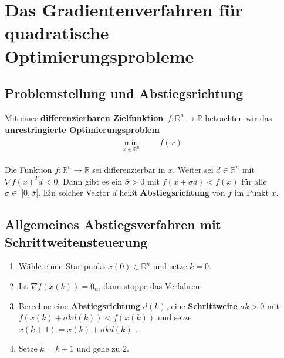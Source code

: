 \chapter{Das Gradientenverfahren für quadratische Optimierungsprobleme}

\section{Problemstellung und Abstiegsrichtung}

Mit einer \textbf{differenzierbaren Zielfunktion}\ $f:\mathbb{R}^n \rightarrow \mathbb{R}$ betrachten wir das \textbf{unrestringierte Optimierungsproblem}
\begin{gather}
\label{eq:P}
\tag{PU}
\begin{aligned}
\min_{x\in \mathbb{R}^n}
& & & f(x)
\end{aligned}
\end{gather}
\begin{Lemma}
	Die Funktion $f:\mathbb{R}^n \rightarrow \mathbb{R}$ sei differenzierbar in $x$. Weiter sei $d \in \mathbb{R}^n$ mit $\nabla f(x)^Td < 0$. Dann gibt es ein $\bar\sigma > 0$ mit $f(x + \sigma d) < f(x)$ f\"ur alle $\sigma \in\ ]0, \bar\sigma [$. Ein solcher Vektor $d$ heißt \textbf{Abstiegsrichtung} von $f$ im Punkt $x$.
\end{Lemma}

\section{Allgemeines Abstiegsverfahren mit Schrittweitensteuerung}

\begin{enumerate}
	\item Wähle einen Startpunkt $x(0) \in \mathbb{R}^n$ und setze $k = 0$.
	\item Ist $\nabla f(x(k)) = 0_n$, dann stoppe das Verfahren.
	\item Berechne eine \textbf{Abstiegsrichtung} $d(k)$, eine \textbf{Schrittweite} $\sigma k > 0$ mit\\
	$f(x(k)+\sigma k d(k)) < f(x(k))$ und setze $x(k+1) = x(k) + \sigma kd(k)$ .
	\item Setze $k = k + 1$ und gehe zu $2$.
\end{enumerate}

